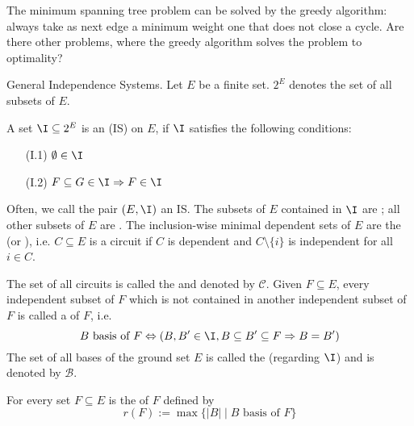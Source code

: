 \begin{lec}[2011-02-02]\end{lec}


\begin{qstn}
The minimum spanning tree problem can be solved by the greedy algorithm:
always take as next edge a minimum weight one that does not close a cycle.
Are there other problems, where the greedy algorithm solves the problem to
optimality?

General Independence Systems.
Let $E$ be a finite set. $2^E$ denotes the set of all subsets of $E$.
\end{qstn}

\begin{defn} %
A set $\I \subseteq 2^E$ is an  (IS) on $E$, if $\I$ satisfies the following
conditions:
\begin{itemize}
\item[(I.1)] $\emptyset \in \I$
\item[(I.2)] $F \subseteq G \in \I \Rightarrow F \in \I$
\end{itemize}
Often, we call the pair $(E, \I)$ an IS. The subsets of $E$ contained in
$\I$ are ; all other subsets of
$E$ are . The inclusion-wise minimal
dependent sets of $E$ are the  (or ), i.e. $C
\subseteq E$ is a circuit if $C$ is dependent and $C \setminus \{i\}$ is
independent for all $i \in C$.

The set of all circuits is called the  and denoted by
$\mathcal{C}$. Given $F \subseteq E$, every independent subset of $F$ which
is not contained in another independent subset of $F$ is called a
 of $F$, i.e.
\[
	B \text{ basis of } F \Leftrightarrow (B, B' \in \I, B \subseteq B'
	\subseteq F \Rightarrow B = B')
\]
The set of all bases of the ground set $E$ is called the  (regarding $\I$) and is denoted by $\mathcal{B}$.

For every set $F \subseteq E$ is the  of $F$ defined by
\[
	r(F) := \max \{ |B| \mid B \text{ basis of } F \}
\]
\end{defn}

